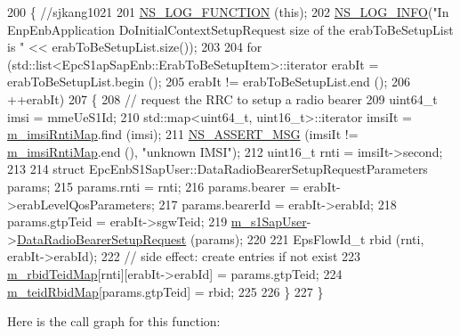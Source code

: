 \begin{DoxyCode}
200 \{ \textcolor{comment}{//sjkang1021}
201   \hyperlink{log-macros-disabled_8h_a90b90d5bad1f39cb1b64923ea94c0761}{NS\_LOG\_FUNCTION} (\textcolor{keyword}{this});
202   \hyperlink{group__logging_gafbd73ee2cf9f26b319f49086d8e860fb}{NS\_LOG\_INFO}(\textcolor{stringliteral}{"In EnpEnbApplication DoInitialContextSetupRequest size of the erabToBeSetupList
       is "} << erabToBeSetupList.size());
203 
204   \textcolor{keywordflow}{for} (std::list<EpcS1apSapEnb::ErabToBeSetupItem>::iterator erabIt = erabToBeSetupList.begin ();
205        erabIt != erabToBeSetupList.end ();
206        ++erabIt)
207     \{
208       \textcolor{comment}{// request the RRC to setup a radio bearer}
209       uint64\_t imsi = mmeUeS1Id;
210       std::map<uint64\_t, uint16\_t>::iterator imsiIt = \hyperlink{classns3_1_1EpcEnbApplication_a9e51467fe97aafabac7d51f056850fea}{m\_imsiRntiMap}.find (imsi);
211       \hyperlink{assert_8h_aff5ece9066c74e681e74999856f08539}{NS\_ASSERT\_MSG} (imsiIt != \hyperlink{classns3_1_1EpcEnbApplication_a9e51467fe97aafabac7d51f056850fea}{m\_imsiRntiMap}.end (), \textcolor{stringliteral}{"unknown IMSI"});
212       uint16\_t rnti = imsiIt->second;
213       
214       \textcolor{keyword}{struct }EpcEnbS1SapUser::DataRadioBearerSetupRequestParameters params;
215       params.rnti = rnti;
216       params.bearer = erabIt->erabLevelQosParameters;
217       params.bearerId = erabIt->erabId;
218       params.gtpTeid = erabIt->sgwTeid;
219       \hyperlink{classns3_1_1EpcEnbApplication_aaafcd864038cc863330565126353c521}{m\_s1SapUser}->\hyperlink{classns3_1_1EpcEnbS1SapUser_a7eb9f4a23a2e071aee15f4dc2300cce4}{DataRadioBearerSetupRequest} (params);
220 
221       EpsFlowId\_t rbid (rnti, erabIt->erabId);
222       \textcolor{comment}{// side effect: create entries if not exist}
223       \hyperlink{classns3_1_1EpcEnbApplication_a06ad312a7c59dd349c44bbdecf3c7358}{m\_rbidTeidMap}[rnti][erabIt->erabId] = params.gtpTeid;
224       \hyperlink{classns3_1_1EpcEnbApplication_abc1df9a1103bb552fc8131e9cd45ab33}{m\_teidRbidMap}[params.gtpTeid] = rbid;
225 
226     \}
227 \}
\end{DoxyCode}


Here is the call graph for this function\+:


